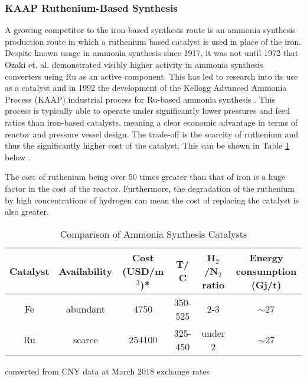 \subsubsection{KAAP Ruthenium-Based Synthesis}

A growing competitor to the iron-based synthesis route is an ammonia synthesis production route in which a ruthenium based catalyst is used in place of the iron. Despite known usage in ammonia synthesis since 1917, it was not until 1972 that Ozaki et. al. demonstrated visibly higher activity in ammonia synthesis converters using Ru as an active component. This has led to research into its use as a catalyst and in 1992 the development of the Kellogg Advanced Ammonia Process (KAAP) industrial process for Ru-based ammonia synthesis \cite{Rossetti2006}. This process is typically able to operate under significantly lower pressures and feed ratios than iron-based catalysts, meaning a clear economic advantage in terms of reactor and pressure vessel design. The trade-off is the scarcity of ruthenium and thus the significantly higher cost of the catalyst. This can be shown in Table \ref{tab:cat} below \cite{Liu2014}.

The cost of ruthenium being over 50 times greater than that of iron is a huge factor in the cost of the reactor. Furthermore, the degradation of the ruthenium by high concentrations of hydrogen can mean the cost of replacing the catalyst is also greater.

\begin{table}[!htbp]

	\begin{center}
		\caption{Comparison of Ammonia Synthesis Catalysts \label{tab:cat}}
		
		\begin{tabular}{|c|c|c|c|c|c|}
			\hline
			Catalyst& Availability & Cost (USD/m$^3$)* & T/ \textdegree C     & H$_2$/N$_2$ ratio & Energy consumption (Gj/t) \\ \hline
			Fe            & abundant              & 4750                          & 350-525 & 2-3             & $\sim$27                      \\ \hline
			Ru            & scarce                & 254100                        & 325-450 & under 2         & $\sim$27                      \\ \hline
		\end{tabular}
		{\small *converted from CNY data at March 2018 exchange rates}
		
	\end{center}
\end{table}

